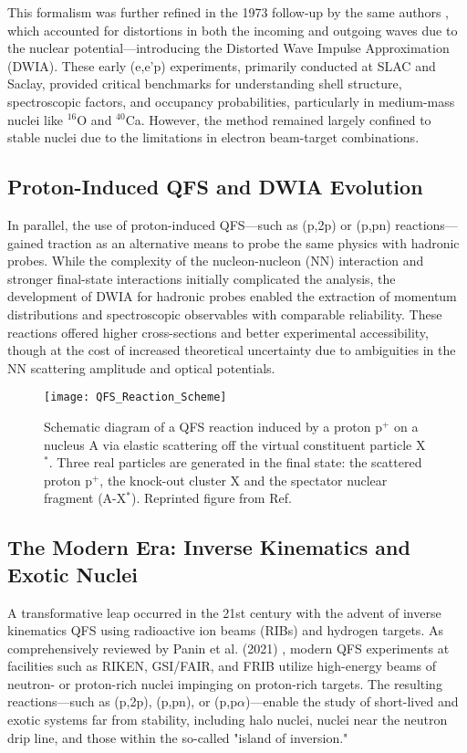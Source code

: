 This formalism was further refined in the 1973 follow-up by the same authors \cite{jacob_quasi-free_1973}, which accounted for distortions in both the incoming and outgoing waves due to the nuclear potential—introducing the Distorted Wave Impulse Approximation (DWIA). These early (e,e'p) experiments, primarily conducted at SLAC and Saclay, provided critical benchmarks for understanding shell structure, spectroscopic factors, and occupancy probabilities, particularly in medium-mass nuclei like $^{16}$O and $^{40}$Ca. However, the method remained largely confined to stable nuclei due to the limitations in electron beam-target combinations.


\subsection{Proton-Induced QFS and DWIA Evolution}

In parallel, the use of proton-induced \gls{QFS}—such as (p,2p) or (p,pn) reactions—gained traction as an alternative means to probe the same physics with hadronic probes. While the complexity of the nucleon-nucleon (NN) interaction and stronger final-state interactions initially complicated the analysis, the development of DWIA for hadronic probes enabled the extraction of momentum distributions and spectroscopic observables with comparable reliability. These reactions offered higher cross-sections and better experimental accessibility, though at the cost of increased theoretical uncertainty due to ambiguities in the NN scattering amplitude and optical potentials.

\begin{figure}
	\texttt{[image: QFS\_Reaction\_Scheme]}
	\caption{Schematic diagram of a QFS reaction induced by a proton p$^+$ on a nucleus A via elastic scattering off the virtual constituent particle X$^*$. Three real particles are generated in the final state: the scattered proton p$^+$, the knock-out cluster X and the spectator nuclear fragment (A-X$^*$). Reprinted figure from Ref. \cite{panin_quasi-free_2021}}
	\label{fig:QFS_Scheme}
\end{figure}

\subsection{The Modern Era: Inverse Kinematics and Exotic Nuclei}

A transformative leap occurred in the 21st century with the advent of inverse kinematics \gls{QFS} using radioactive ion beams (RIBs) and hydrogen targets. As comprehensively reviewed by Panin et al. (2021) \cite{panin_quasi-free_2021}, modern \gls{QFS} experiments at facilities such as RIKEN, GSI/FAIR, and FRIB utilize high-energy beams of neutron- or proton-rich nuclei impinging on proton-rich targets. The resulting reactions—such as (p,2p), (p,pn), or (p,p$\alpha$)—enable the study of short-lived and exotic systems far from stability, including halo nuclei, nuclei near the neutron drip line, and those within the so-called "island of inversion."

